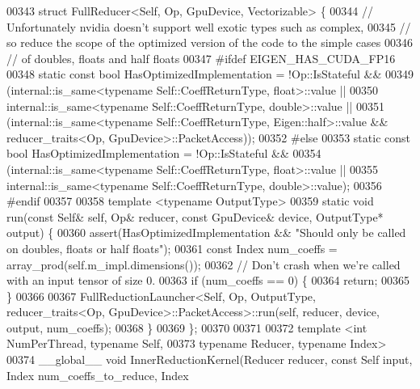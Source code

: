 \begin{DoxyCode}
00343 \textcolor{keyword}{struct }FullReducer<Self, Op, GpuDevice, Vectorizable> \{
00344   \textcolor{comment}{// Unfortunately nvidia doesn't support well exotic types such as complex,}
00345   \textcolor{comment}{// so reduce the scope of the optimized version of the code to the simple cases}
00346   \textcolor{comment}{// of doubles, floats and half floats}
00347 \textcolor{preprocessor}{#ifdef EIGEN\_HAS\_CUDA\_FP16}
00348   \textcolor{keyword}{static} \textcolor{keyword}{const} \textcolor{keywordtype}{bool} HasOptimizedImplementation = !Op::IsStateful &&
00349       (internal::is\_same<typename Self::CoeffReturnType, float>::value ||
00350        internal::is\_same<typename Self::CoeffReturnType, double>::value ||
00351        (internal::is\_same<typename Self::CoeffReturnType, Eigen::half>::value && reducer\_traits<Op,
       GpuDevice>::PacketAccess));
00352 \textcolor{preprocessor}{#else}
00353   \textcolor{keyword}{static} \textcolor{keyword}{const} \textcolor{keywordtype}{bool} HasOptimizedImplementation = !Op::IsStateful &&
00354                                                 (internal::is\_same<typename Self::CoeffReturnType,
       float>::value ||
00355                                                  internal::is\_same<typename Self::CoeffReturnType,
       double>::value);
00356 \textcolor{preprocessor}{#endif}
00357 
00358   \textcolor{keyword}{template} <\textcolor{keyword}{typename} OutputType>
00359   \textcolor{keyword}{static} \textcolor{keywordtype}{void} run(\textcolor{keyword}{const} Self& \textcolor{keyword}{self}, Op& reducer, \textcolor{keyword}{const} GpuDevice& device, OutputType* output) \{
00360     assert(HasOptimizedImplementation && \textcolor{stringliteral}{"Should only be called on doubles, floats or half floats"});
00361     \textcolor{keyword}{const} Index num\_coeffs = array\_prod(\textcolor{keyword}{self}.m\_impl.dimensions());
00362     \textcolor{comment}{// Don't crash when we're called with an input tensor of size 0.}
00363     \textcolor{keywordflow}{if} (num\_coeffs == 0) \{
00364       \textcolor{keywordflow}{return};
00365     \}
00366 
00367     FullReductionLauncher<Self, Op, OutputType, reducer\_traits<Op, GpuDevice>::PacketAccess>::run(\textcolor{keyword}{self}, 
      reducer, device, output, num\_coeffs);
00368   \}
00369 \};
00370 
00371 
00372 \textcolor{keyword}{template} <\textcolor{keywordtype}{int} NumPerThread, \textcolor{keyword}{typename} Self,
00373           \textcolor{keyword}{typename} Reducer, \textcolor{keyword}{typename} Index>
00374 \_\_global\_\_ \textcolor{keywordtype}{void} InnerReductionKernel(Reducer reducer, \textcolor{keyword}{const} Self input, Index num\_coeffs\_to\_reduce, Index 

\end{DoxyCode}
